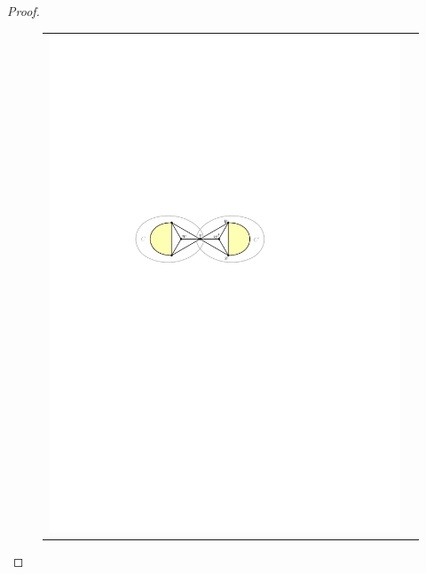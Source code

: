 \documentclass{article}
\theoremstyle{definition}
\begin{document}
\begin{proof}
\begin{figure}[htpb]
\begin{tabular}{cc}
      \includegraphics[page=2]{figs/isolated} &

\end{tabular}
\end{figure}
\end{proof}
\end{document}
